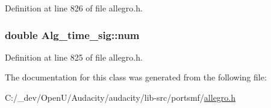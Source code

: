 Definition at line 826 of file allegro.\+h.

\subsubsection[{\texorpdfstring{num}{num}}]{\setlength{\rightskip}{0pt plus 5cm}double Alg\+\_\+time\+\_\+sig\+::num}\hypertarget{class_alg__time__sig_a79476aacf5e3138f24ee80f56d6fc580}{}\label{class_alg__time__sig_a79476aacf5e3138f24ee80f56d6fc580}


Definition at line 825 of file allegro.\+h.



The documentation for this class was generated from the following file\+:\begin{DoxyCompactItemize}
\item 
C\+:/\+\_\+dev/\+Open\+U/\+Audacity/audacity/lib-\/src/portsmf/\hyperlink{allegro_8h}{allegro.\+h}\end{DoxyCompactItemize}
